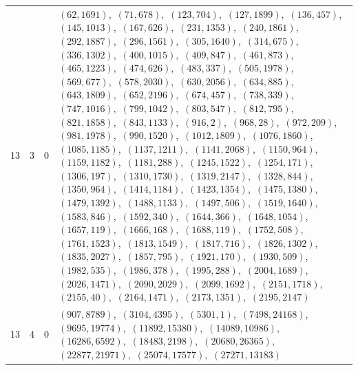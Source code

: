 \documentclass[11pt]{article}
\begin{document}
\begin{longtable}{@{}rrl>{\raggedright\arraybackslash}p{}@{}}
13 & 3 & $0$ & $(62,1691)$,\allowbreak\ $(71,678)$,\allowbreak\ $(123,704)$,\allowbreak\ $(127,1899)$,\allowbreak\ $(136,457)$,\allowbreak\ $(145,1013)$,\allowbreak\ $(167,626)$,\allowbreak\ $(231,1353)$,\allowbreak\ $(240,1861)$,\allowbreak\ $(292,1887)$,\allowbreak\ $(296,1561)$,\allowbreak\ $(305,1640)$,\allowbreak\ $(314,675)$,\allowbreak\ $(336,1302)$,\allowbreak\ $(400,1015)$,\allowbreak\ $(409,847)$,\allowbreak\ $(461,873)$,\allowbreak\ $(465,1223)$,\allowbreak\ $(474,626)$,\allowbreak\ $(483,337)$,\allowbreak\ $(505,1978)$,\allowbreak\ $(569,677)$,\allowbreak\ $(578,2030)$,\allowbreak\ $(630,2056)$,\allowbreak\ $(634,885)$,\allowbreak\ $(643,1809)$,\allowbreak\ $(652,2196)$,\allowbreak\ $(674,457)$,\allowbreak\ $(738,339)$,\allowbreak\ $(747,1016)$,\allowbreak\ $(799,1042)$,\allowbreak\ $(803,547)$,\allowbreak\ $(812,795)$,\allowbreak\ $(821,1858)$,\allowbreak\ $(843,1133)$,\allowbreak\ $(916,2)$,\allowbreak\ $(968,28)$,\allowbreak\ $(972,209)$,\allowbreak\ $(981,1978)$,\allowbreak\ $(990,1520)$,\allowbreak\ $(1012,1809)$,\allowbreak\ $(1076,1860)$,\allowbreak\ $(1085,1185)$,\allowbreak\ $(1137,1211)$,\allowbreak\ $(1141,2068)$,\allowbreak\ $(1150,964)$,\allowbreak\ $(1159,1182)$,\allowbreak\ $(1181,288)$,\allowbreak\ $(1245,1522)$,\allowbreak\ $(1254,171)$,\allowbreak\ $(1306,197)$,\allowbreak\ $(1310,1730)$,\allowbreak\ $(1319,2147)$,\allowbreak\ $(1328,844)$,\allowbreak\ $(1350,964)$,\allowbreak\ $(1414,1184)$,\allowbreak\ $(1423,1354)$,\allowbreak\ $(1475,1380)$,\allowbreak\ $(1479,1392)$,\allowbreak\ $(1488,1133)$,\allowbreak\ $(1497,506)$,\allowbreak\ $(1519,1640)$,\allowbreak\ $(1583,846)$,\allowbreak\ $(1592,340)$,\allowbreak\ $(1644,366)$,\allowbreak\ $(1648,1054)$,\allowbreak\ $(1657,119)$,\allowbreak\ $(1666,168)$,\allowbreak\ $(1688,119)$,\allowbreak\ $(1752,508)$,\allowbreak\ $(1761,1523)$,\allowbreak\ $(1813,1549)$,\allowbreak\ $(1817,716)$,\allowbreak\ $(1826,1302)$,\allowbreak\ $(1835,2027)$,\allowbreak\ $(1857,795)$,\allowbreak\ $(1921,170)$,\allowbreak\ $(1930,509)$,\allowbreak\ $(1982,535)$,\allowbreak\ $(1986,378)$,\allowbreak\ $(1995,288)$,\allowbreak\ $(2004,1689)$,\allowbreak\ $(2026,1471)$,\allowbreak\ $(2090,2029)$,\allowbreak\ $(2099,1692)$,\allowbreak\ $(2151,1718)$,\allowbreak\ $(2155,40)$,\allowbreak\ $(2164,1471)$,\allowbreak\ $(2173,1351)$,\allowbreak\ $(2195,2147)$\\
13 & 4 & $0$ & $(907,8789)$,\allowbreak\ $(3104,4395)$,\allowbreak\ $(5301,1)$,\allowbreak\ $(7498,24168)$,\allowbreak\ $(9695,19774)$,\allowbreak\ $(11892,15380)$,\allowbreak\ $(14089,10986)$,\allowbreak\ $(16286,6592)$,\allowbreak\ $(18483,2198)$,\allowbreak\ $(20680,26365)$,\allowbreak\ $(22877,21971)$,\allowbreak\ $(25074,17577)$,\allowbreak\ $(27271,13183)$\\

\end{longtable}
\end{document}
